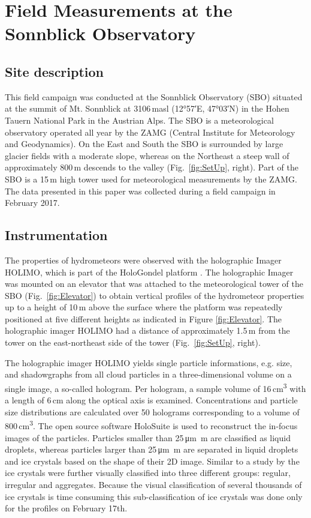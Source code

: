 \documentclass[draft,linenumbers]{agujournal}
\begin{document}
\section{Field Measurements at the Sonnblick Observatory}
\label{sectionMeasurementSite}

\subsection{Site description}

This field campaign was conducted at the Sonnblick Observatory (SBO) situated at the summit of Mt. Sonnblick at 3106\,\si{masl} (\ang{12;57;}E, \ang{47;03;}N) in the Hohen Tauern National Park in the Austrian Alps. The SBO is a meteorological observatory operated all year by the ZAMG (Central Institute for Meteorology and Geodynamics). On the East and South the SBO is surrounded by large glacier fields with a moderate slope, whereas on the Northeast a steep wall of approximately 800\,\si{m} descends to the valley (Fig.~\ref{fig:SetUp}, right). Part of the SBO is a 15\,\si{m} high tower used for meteorological measurements by the ZAMG. The data presented in this paper was collected during a field campaign in February 2017. 

\subsection{Instrumentation}
The properties of hydrometeors were observed with the holographic Imager HOLIMO, which is part of the HoloGondel platform \citep{Bec17}. The holographic Imager was mounted on an elevator that was attached to the meteorological tower of the SBO (Fig.~\ref{fig:Elevator}) to obtain vertical profiles of the hydrometeor properties up to a height of 10\,\si{m} above the surface where the platform was repeatedly positioned at five different heights as indicated in Figure \ref{fig:Elevator}. The holographic imager HOLIMO had a distance of approximately 1.5\,\si{m} from the tower on the east-northeast side of the tower (Fig.~\ref{fig:SetUp}, right). 

The holographic imager HOLIMO yields single particle informations, e.g. size, and shadowgraphs from all cloud particles in a three-dimensional volume on a single image, a so-called hologram. Per hologram, a sample volume of 16\,\si{cm^3} with a length of 6\,\si{cm} along the optical axis is examined. Concentrations and particle size distributions are calculated over 50 holograms corresponding to a volume of 800\,\si{cm^3}. The open source software HoloSuite \citep{Fug15} is used to reconstruct the in-focus images of the particles. Particles smaller than 25\,\si{\um m} are classified as liquid droplets, whereas particles larger than 25\,\si{\um m} are separated in liquid droplets and ice crystals based on the shape of their 2D image. Similar to a study by \cite{Sch17} the ice crystals were further visually classified into three different groups: regular, irregular and aggregates. Because the visual classification of several thousands of ice crystals is time consuming this sub-classification of ice crystals was done only for the profiles on February 17th.
\end{document}
